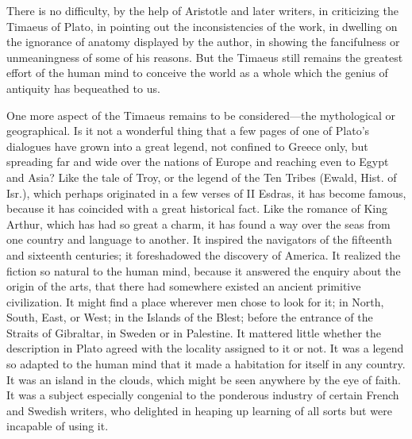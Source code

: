 There is no difficulty, by the help of Aristotle and later writers, in
criticizing the Timaeus of Plato, in pointing out the inconsistencies of
the work, in dwelling on the ignorance of anatomy displayed by the author,
in showing the fancifulness or unmeaningness of some of his reasons. But
the Timaeus still remains the greatest effort of the human mind to
conceive the world as a whole which the genius of antiquity has bequeathed
to us.

One more aspect of the Timaeus remains to be considered—the
mythological or geographical. Is it not a wonderful thing that a few pages
of one of Plato’s dialogues have grown into a great legend, not confined
to Greece only, but spreading far and wide over the nations of Europe and
reaching even to Egypt and Asia? Like the tale of Troy, or the legend of
the Ten Tribes (Ewald, Hist. of Isr.), which perhaps originated in a few
verses of II Esdras, it has become famous, because it has coincided with a
great historical fact. Like the romance of King Arthur, which has had so
great a charm, it has found a way over the seas from one country and
language to another. It inspired the navigators of the fifteenth and
sixteenth centuries; it foreshadowed the discovery of America. It realized
the fiction so natural to the human mind, because it answered the enquiry
about the origin of the arts, that there had somewhere existed an ancient
primitive civilization. It might find a place wherever men chose to look
for it; in North, South, East, or West; in the Islands of the Blest;
before the entrance of the Straits of Gibraltar, in Sweden or in
Palestine. It mattered little whether the description in Plato agreed with
the locality assigned to it or not. It was a legend so adapted to the
human mind that it made a habitation for itself in any country. It was an
island in the clouds, which might be seen anywhere by the eye of faith. It
was a subject especially congenial to the ponderous industry of certain
French and Swedish writers, who delighted in heaping up learning of all
sorts but were incapable of using it.

